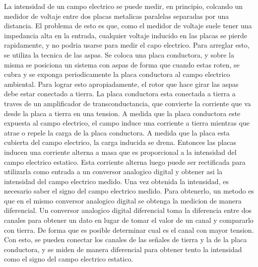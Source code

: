 
La intensidad de un campo electrico se puede medir, en principio, colcando un medidor de voltaje entre dos placas metalicas paralelas separadas por una distancia. El problema de esto es que, como el medidor de voltaje suele tener una impedancia alta en la entrada, cualquier voltaje inducido en las placas se pierde rapidamente, y no podria usarse para medir el capo electrico. Para arreglar esto, se utiliza la tecnica de las aspas. Se coloca una placa conductora, y sobre la misma se posiciona un sistema con aspas de forma que cuando estas roten, se cubra y se exponga periodicamente la placa conductora al campo electrico ambiental. Para lograr esto apropiadamente, el rotor que hace girar las aspas debe estar conectado a tierra. La placa conductora esta conectada a tierra a traves de un amplificador de transconductancia, que convierte la corriente que va desde la placa a tierra en una tension. A medida que la placa conductora este expuesta al campo electrico, el campo induce una corriente a tierra mientras que atrae o repele la carga de la placa conductora. A medida que la placa esta cubierta del campo electrico, la carga inducida se drena. Entonces las placas inducen una corriente alterna a masa que es proporcional a la intensidad del campo electrico estatico. Esta corriente alterna luego puede ser rectificada para utilizarla como entrada a un conversor analogico digital y obtener asi la intensidad del campo electrico medido.
Una vez obtenida la intensidad, es necesario saber el signo del campo electrico medido. Para obtenerlo, un metodo es que en el mismo conversor analogico digital se obtenga la medicion de manera diferencial. Un conversor analogico digital diferencial toma la diferencia entre dos canales para obtener un dato en lugar de tomar el valor de un canal y compararlo con tierra. De forma que es posible determinar cual es el canal con mayor tension. Con esto, se pueden conectar los canales de las señales de tierra y la de la placa conductora, y se miden de manera diferencial para obtener tento la intensidad como el signo del campo electrico estatico.





